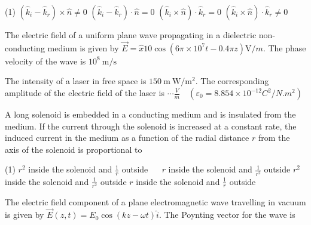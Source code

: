 \begin{enumerate}
\begin{minipage}{\textwidth}
\end{minipage}
\begin{tasks}(1)
	\task[\textbf{A.}] $\left(\hat{k}_{i}-\hat{k}_{r}\right) \times \hat{n} \neq 0$
	\task[\textbf{B.}]$\left(\hat{k}_{i}-\hat{k}_{r}\right) \cdot \hat{n}=0$
	\task[\textbf{C.}]$\left(\hat{k}_{i} \times \hat{n}\right) \cdot \hat{k}_{r}=0$
	\task[\textbf{D.}]$\left(\hat{k}_{i} \times \hat{n}\right) \cdot \hat{k}_{r} \neq 0$
\end{tasks}
\begin{minipage}{\textwidth}
	\item The electric field of a uniform plane wave propagating in a dielectric non-conducting medium is given by $\vec{E}=\hat{x} 10 \cos \left(6 \pi \times 10^{7} t-0.4 \pi z\right) \mathrm{V} / m$. The phase velocity of the wave is $10^{8} \mathrm{~m} / \mathrm{s}$ 
\end{minipage}
\begin{minipage}{\textwidth}
	\item The intensity of a laser in free space is $150 \mathrm{~m} \mathrm{~W} / \mathrm{m}^{2}$. The corresponding amplitude of the electric field of the laser is $\cdots\frac{V}{m} \quad\left(\varepsilon_{0}=8.854 \times 10^{-12} C^{2} / N . m^{2}\right)$
\end{minipage}
\begin{minipage}{\textwidth}
	\item A long solenoid is embedded in a conducting medium and is insulated from the medium. If the current through the solenoid is increased at a constant rate, the induced current in the medium as a function of the radial distance $r$ from the axis of the solenoid is proportional to
\end{minipage}
\begin{tasks}(1)
	\task[\textbf{A.}] $r^{2}$ inside the solenoid and $\frac{1}{r}$ outside $\quad$  
	\task[\textbf{B.}]$r$ inside the solenoid and $\frac{1}{r^{2}}$ outside
	\task[\textbf{C.}] $r^{2}$ inside the solenoid and $\frac{1}{r^{2}}$ outside
	\task[\textbf{D.}]$r$ inside the solenoid and $\frac{1}{r}$ outside
\end{tasks}
\begin{minipage}{\textwidth}
	\item The electric field component of a plane electromagnetic wave travelling in vacuum is given by $\vec{E}(z, t)=E_{0} \cos (k z-\omega t) \hat{i}$. The Poynting vector for the wave is
\end{minipage}

\end{enumerate}
